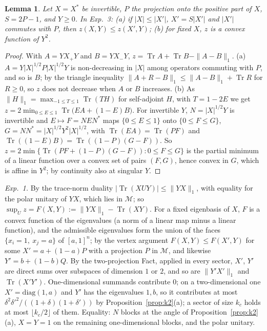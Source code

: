 \documentclass[11pt]{article}
\DeclareMathOperator{\Tr}{Tr}
\newcommand{\M}{\mathcal{M}}
\newtheorem{lemma}[proposition]{Lemma}
\begin{document}
\begin{lemma}\label{lem:exp3}
Let $X=X^*$ be invertible, $P$ the projection onto the positive part of $X$, $S=2P-1$, and $Y\ge0$. In Exp.~3:
(a) if $|X|\le|X'|$, $X'=S|X'|$ and $|X'|$ commutes with $P$, then $z(X,Y)\le z(X',Y)$; (b) for fixed $X$, $z$ is
a convex function of $Y^2$.
\end{lemma}
\begin{proof}
With $A=YX_+Y$ and $B=YX_-Y$, $z=\Tr A+\Tr B-\|A-B\|_1$. (a) $A=Y|X|^{1/2}P|X|^{1/2}Y$ is non-decreasing in $|X|$ among
operators commuting with $P$, and so is $B$; by the triangle inequality $\|A+R-B\|_1\le\|A-B\|_1+\Tr R$ for $R\ge0$,
so $z$ does not decrease when $A$ or $B$ increases. (b) As $\|H\|_1=\max_{-1\le T\le1}\Tr(TH)$ for self-adjoint $H$, with
$T=1-2E$ we get $z=2\min_{0\le E\le1}\Tr\bigl(EA+(1-E)B\bigr)$. For invertible $Y$, $N=|X|^{1/2}Y$ is invertible and
$E\mapsto F=NEN^*$ maps $\{0\le E\le1\}$ onto $\{0\le F\le G\}$, $G=NN^*=|X|^{1/2}Y^2|X|^{1/2}$, with $\Tr(EA)=\Tr(PF)$ and
$\Tr((1-E)B)=\Tr((1-P)(G-F))$. So $z=2\min\{\Tr(PF+(1-P)(G-F)):0\le F\le G\}$ is the partial minimum of a linear
function over a convex set of pairs $(F,G)$, hence convex in $G$, which is affine in $Y^2$; by continuity also at
singular $Y$.
\end{proof}

\emph{Exp.~1.} By the trace-norm duality $|\Tr(XUY)|\le\|YX\|_1$, with equality for the polar unitary of $YX$, which
lies in $\M$; so $\sup_Uz=F(X,Y):=\|YX\|_1-\Tr(XY)$. For a fixed eigenbasis of $X$, $F$ is a convex function of the
eigenvalues (a norm of a linear map minus a linear function), and the admissible eigenvalues form the union of the
faces $\{x_i=1,\ x_j=a\}$ of $[a,1]^n$; by the vertex argument $F(X,Y)\le F(X',Y)$ for some $X'=a+(1-a)P$ with a
projection $P$ in $\M$, and likewise $Y'=b+(1-b)Q$. By the two-projection Fact, applied in every sector, $X'$, $Y'$ are
direct sums over subspaces of dimension $1$ or $2$, and so are $\|Y'X'\|_1$ and $\Tr(X'Y')$. One-dimensional summands
contribute $0$; on a two-dimensional one $X'=\mathrm{diag}(1,a)$ and $Y'$ has the eigenvalues $1,b$, so it contributes
at most $\delta^2\delta'^2/((1+\delta)(1+\delta'))$ by Proposition~\ref{prop:k2}(a); a sector of size $k_c$ holds at most
$\lfloor k_c/2\rfloor$ of them. Equality: $N$ blocks at the angle of Proposition~\ref{prop:k2}(a), $X=Y=1$ on the
remaining one-dimensional blocks, and the polar unitary.
\end{document}
